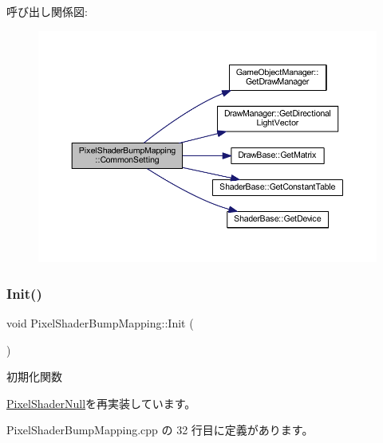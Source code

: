呼び出し関係図\+:\nopagebreak
\begin{figure}[H]
\begin{center}
\leavevmode
\includegraphics[width=350pt]{class_pixel_shader_bump_mapping_af62a2b40930533a3bae17319f876705d_cgraph}
\end{center}
\end{figure}
\mbox{\label{class_pixel_shader_bump_mapping_ab7807b7c56242e965ddb23e66e1a5d9e}} 
\subsubsection{\texorpdfstring{Init()}{Init()}}
{\footnotesize\ttfamily void Pixel\+Shader\+Bump\+Mapping\+::\+Init (\begin{DoxyParamCaption}{ }\end{DoxyParamCaption})\hspace{0.3cm}{\ttfamily [virtual]}}



初期化関数 



\mbox{\hyperlink{class_pixel_shader_null_abfd7a6a986da09061a55d31024219eba}{Pixel\+Shader\+Null}}を再実装しています。



 Pixel\+Shader\+Bump\+Mapping.\+cpp の 32 行目に定義があります。

